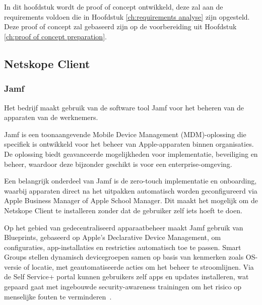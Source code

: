 
\chapter{}%
\label{ch:proof of concept implementation}

In dit hoofdstuk wordt de proof of concept ontwikkeld, deze zal aan de requirements voldoen die in Hoofdstuk \ref{ch:requirements analyse} zijn opgesteld. Deze proof of concept zal gebaseerd zijn op de voorbereiding uit Hoofdstuk \ref{ch:proof of concept preparation}.

\section{Netskope Client}

\subsection{Jamf}
Het bedrijf maakt gebruik van de software tool Jamf voor het beheren van de apparaten van de werknemers.

\vspace{2ex}

Jamf is een toonaangevende Mobile Device Management (MDM)-oplossing die specifiek is ontwikkeld voor het beheer van Apple-apparaten binnen organisaties. De oplossing biedt geavanceerde mogelijkheden voor implementatie, beveiliging en beheer, waardoor deze bijzonder geschikt is voor een enterprise-omgeving.  

\vspace{2ex}

Een belangrijk onderdeel van Jamf is de zero-touch implementatie en onboarding, waarbij apparaten direct na het uitpakken automatisch worden geconfigureerd via Apple Business Manager of Apple School Manager.  Dit maakt het mogelijk om de Netskope Client te installeren zonder dat de gebruiker zelf iets hoeft te doen.

\vspace{2ex}

Op het gebied van gedecentraliseerd apparaatbeheer maakt Jamf gebruik van Blueprints, gebaseerd op Apple’s Declarative Device Management, om configuraties, app-installaties en restricties automatisch toe te passen. Smart Groups stellen dynamisch devicegroepen samen op basis van kenmerken zoals OS-versie of locatie, met geautomatiseerde acties om het beheer te stroomlijnen. Via de Self Service+ portal kunnen gebruikers zelf apps en updates installeren, wat gepaard gaat met ingebouwde security-awareness trainingen om het risico op menselijke fouten te verminderen~\autocite{Jamf2025}.

